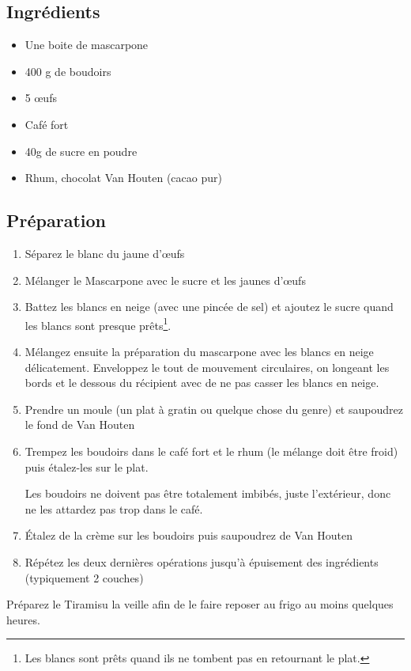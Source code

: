 \subsection*{Ingrédients}
\begin{itemize}
\item Une boite de mascarpone
\item 400 g de boudoirs
\item 5 œufs
\item Café fort
\item 40g de sucre en poudre
\item Rhum, chocolat Van Houten (cacao pur)
\end{itemize}

\subsection*{Préparation}
\begin{enumerate}
\item Séparez le blanc du jaune d'œufs
\item Mélanger le Mascarpone avec le sucre et les jaunes d'œufs
\item Battez les blancs en neige (avec une pincée de sel) et ajoutez le sucre quand les blancs sont presque prêts\footnote{Les blancs sont prêts quand ils ne tombent pas en retournant le plat.}.
\item Mélangez ensuite la préparation du mascarpone avec les blancs en neige délicatement. Enveloppez le tout de mouvement circulaires, on longeant les bords et le dessous du récipient avec de ne pas casser les blancs en neige.
\item Prendre un moule (un plat à gratin ou quelque chose du genre) et saupoudrez le fond de Van Houten
\item Trempez les boudoirs dans le café fort et le rhum (le mélange doit être froid) puis étalez-les sur le plat.
\begin{remarque}
Les boudoirs ne doivent pas être totalement imbibés, juste l'extérieur, donc ne les attardez pas trop dans le café.
\end{remarque}
\item Étalez de la crème sur les boudoirs puis saupoudrez de Van Houten
\item Répétez les deux dernières opérations jusqu'à épuisement des ingrédients (typiquement 2 couches)
\end{enumerate}

\begin{remarque}
Préparez le Tiramisu la veille afin de le faire reposer au frigo au moins quelques heures.
\end{remarque}